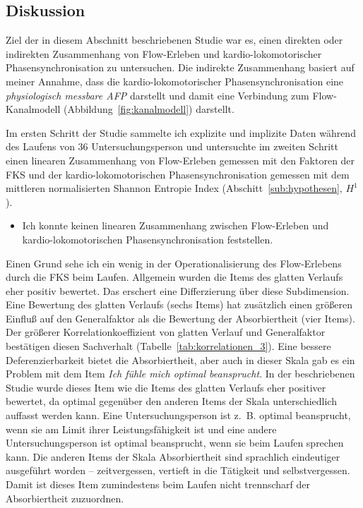 
\subsection{Diskussion} 

\label{sub:diskussion_5_3}

Ziel der in diesem Abschnitt beschriebenen Studie war es, einen direkten oder indirekten Zusammenhang von Flow-Erleben und kardio-lokomotorischer Phasensynchronisation zu untersuchen. Die indirekte Zusammenhang basiert auf meiner Annahme, dass die kardio-lokomotorischer Phasensynchronisation eine \emph{physiologisch messbare \ac{AFP}} darstellt und damit eine Verbindung zum Flow-Kanalmodell (Abbildung~\ref{fig:kanalmodell}) darstellt. 

Im ersten Schritt der Studie sammelte ich explizite und implizite Daten während des Laufens von 36 Untersuchungsperson und untersuchte im zweiten Schritt einen linearen Zusammenhang von Flow-Erleben gemessen mit den Faktoren der \ac{FKS} und der kardio-lokomotorischen Phasensynchronisation gemessen mit dem mittleren normalisierten Shannon Entropie Index (Abschitt~\ref{sub:hypothesen}, $H^1$). 

\begin{itemize}

	\item Ich konnte keinen linearen Zusammenhang zwischen Flow-Erleben und kardio-lokomotorischen Phasensynchronisation feststellen.

\end{itemize}


Einen Grund sehe ich ein wenig in der Operationalisierung des Flow-Erlebens durch die \ac{FKS} beim Laufen. Allgemein wurden die Items des glatten Verlaufs eher positiv bewertet. Das erschert eine Differzierung über diese Subdimension. Eine Bewertung des glatten Verlaufs (sechs Items) hat zusätzlich einen größeren Einfluß auf den Generalfaktor als die Bewertung der Absorbiertheit (vier Items). Der größerer Korrelationkoeffizient von glatten Verlauf und Generalfaktor bestätigen diesen Sachverhalt (Tabelle~\ref{tab:korrelationen_3}). Eine bessere Deferenzierbarkeit bietet die Absorbiertheit, aber auch in dieser Skala gab es ein Problem mit dem Item \emph{Ich fühle mich optimal beansprucht}. In der beschriebenen Studie wurde dieses Item wie die Items des glatten Verlaufs eher positiver bewertet, da optimal gegenüber den anderen Items der Skala unterschiedlich auffasst werden kann. Eine Untersuchungsperson ist z.~B. optimal beansprucht, wenn sie am Limit ihrer Leistungsfähigkeit ist und eine andere Untersuchungsperson ist optimal beansprucht, wenn sie beim Laufen sprechen kann. Die anderen Items der Skala Absorbiertheit sind sprachlich eindeutiger ausgeführt worden -- zeitvergessen, vertieft in die Tätigkeit und selbstvergessen. Damit ist dieses Item zumindestens beim Laufen nicht trennscharf der Absorbiertheit zuzuordnen. 
 
